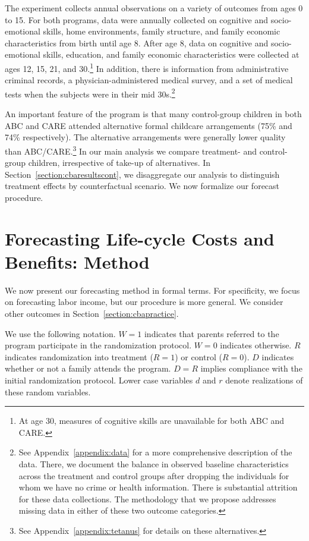 The experiment collects annual observations on a variety of outcomes from ages 0 to 15. For both programs, data were annually collected on cognitive and socio-emotional skills, home environments, family structure, and family economic characteristics from birth until age 8. After age 8, data on cognitive and socio-emotional skills, education, and family economic characteristics were collected at ages 12, 15, 21, and 30.\footnote{At age 30, measures of cognitive skills are unavailable for both ABC and CARE.} In addition, there is information from administrative criminal records, a physician-administered medical survey, and a set of medical tests when the subjects were in their mid 30s.\footnote{See  Appendix~\ref{appendix:data} for a more comprehensive description of the data. There, we document the balance in observed baseline characteristics across the treatment and control groups after dropping the individuals for whom we have no crime or health information. There is substantial attrition for these data collections. The methodology that we propose addresses missing data in either of these two outcome categories.}

An important feature of the program is that many control-group children in both ABC and CARE attended alternative formal childcare arrangements (75\% and 74\% respectively). The alternative arrangements were generally lower quality than ABC/CARE.\footnote{See Appendix~\ref{appendix:tetanus} for details on these alternatives.} In our main analysis we compare treatment- and control-group children, irrespective of take-up of alternatives. In Section~\ref{section:cbaresultscont}, we disaggregate our analysis to distinguish treatment effects by counterfactual scenario. We now formalize our forecast procedure. 

\section{Forecasting Life-cycle Costs and Benefits: Method} \label{section:cbamethodology}

We now present our forecasting method in formal terms. For specificity, we focus on forecasting labor income, but our procedure is more general. We consider other outcomes in Section~\ref{section:cbapractice}.

We use the following notation. $W=1$ indicates that parents referred to the program participate in the randomization protocol. $W=0$ indicates otherwise. $R$ indicates randomization into treatment ($R = 1$) or control ($R = 0$). $D$ indicates whether or not a family attends the program. $D = R$ implies compliance with the initial randomization protocol. Lower case variables $d$ and $r$ denote realizations of these random variables.

